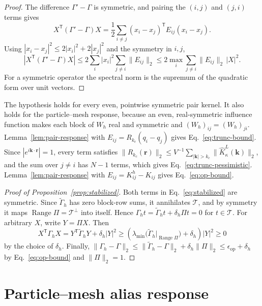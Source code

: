 \documentclass[11pt]{article}
\theoremstyle{plain}
\newcommand{\rr}{\bm r}
\newcommand{\kk}{\bm k}
\newcommand{\cT}{\mathcal{T}}
\newcommand{\Range}{\operatorname{Range}}
\DeclareRobustCommand{\_}{\textunderscore\allowbreak}
\begin{document}
\begin{proof}
The difference $\Gamma'-\Gamma$ is symmetric, and pairing the $(i,j)$ and
$(j,i)$ terms gives
\begin{equation}
X^{\mathsf T}(\Gamma'-\Gamma)X
=
\frac12\sum_{i\ne j}(x_i-x_j)^{\mathsf T}E_{ij}(x_i-x_j).
\end{equation}
Using $|x_i-x_j|^2\le2|x_i|^2+2|x_j|^2$ and the symmetry in $i,j$,
\begin{equation}
\left|X^{\mathsf T}(\Gamma'-\Gamma)X\right|
\le
2\sum_i|x_i|^2\sum_{j\ne i}\|E_{ij}\|_2
\le
2\max_i\sum_{j\ne i}\|E_{ij}\|_2\,|X|^2 .
\end{equation}
For a symmetric operator the spectral norm is the supremum of the
quadratic form over unit vectors.
\end{proof}

The hypothesis holds for every even, pointwise symmetric pair kernel. It
also holds for the particle--mesh response, because an even, real-symmetric
influence function makes each block of $W_h$ real and symmetric and
$(W_h)_{ij}=(W_h)_{ji}$. Lemma~\ref{lem:pair-response} with
$E_{ij}=R_{k_c}(q_i-q_j)$ gives Eq.~\eqref{eq:trunc-bound}. Since
$|e^{i\kk\cdot\rr}|=1$, every term satisfies
$\|R_{k_c}(\rr)\|_2\le V^{-1}\sum_{|\kk|>k_c}\|\widehat K_\kappa^L(\kk)\|_2$,
and the sum over $j\ne i$ has $N-1$ terms, which gives
Eq.~\eqref{eq:trunc-pessimistic}. Lemma~\ref{lem:pair-response} with
$E_{ij}=K^h_{ij}-K_{ij}$ gives Eq.~\eqref{eq:op-bound}.

\begin{proof}[Proof of Proposition~\ref{prop:stabilized}]
Both terms in Eq.~\eqref{eq:stabilized} are symmetric. Since
$\widetilde\Gamma_h$ has zero block-row sums, it annihilates $\cT$, and by
symmetry it maps $\Range\Pi=\cT^\perp$ into itself. Hence
$\Gamma_h t=\widetilde\Gamma_h t+\delta_h\Pi t=0$ for $t\in\cT$. For
arbitrary $X$, write $Y=\Pi X$. Then
\begin{equation}
X^{\mathsf T}\Gamma_hX
=
Y^{\mathsf T}\widetilde\Gamma_hY+\delta_h|Y|^2
\ge
\left(
\lambda_{\min}\bigl(\widetilde\Gamma_h|_{\Range\Pi}\bigr)+\delta_h
\right)|Y|^2
\ge0
\end{equation}
by the choice of $\delta_h$. Finally,
$\|\Gamma_h-\Gamma\|_2\le\|\widetilde\Gamma_h-\Gamma\|_2+\delta_h\|\Pi\|_2
\le\epsilon_{\mathrm{op}}+\delta_h$ by Eq.~\eqref{eq:op-bound} and
$\|\Pi\|_2=1$.
\end{proof}

\section{Particle--mesh alias response}
\label{app:alias}
\end{document}
